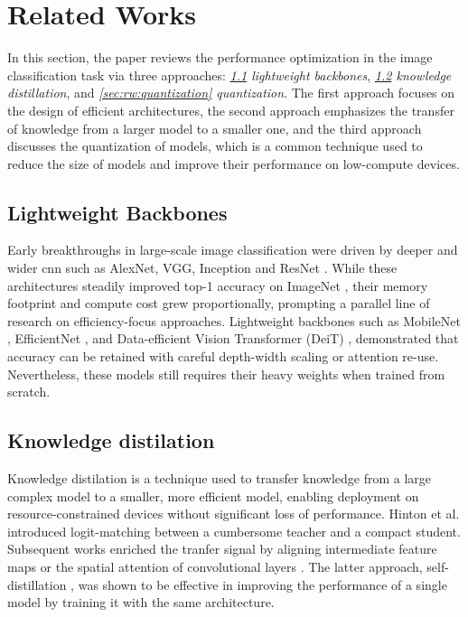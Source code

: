 \section{Related Works}

In this section, the paper reviews the performance optimization
in the image classification task via three approaches:
\textit{\ref{sec:rw:lightweight_backbones} lightweight backbones},
\textit{\ref{sec:rw:knowledge_distillation} knowledge distillation},
and \textit{\ref{sec:rw:quantization} quantization}.
The first approach focuses on the design of efficient architectures,
the second approach emphasizes the transfer of knowledge from a larger model to a smaller one,
and the third approach discusses the quantization of models,
which is a common technique used to reduce the size of models
and improve their performance on low-compute devices.

\subsection{Lightweight Backbones}
\label{sec:rw:lightweight_backbones}

Early breakthroughs in large-scale image classification were driven by deeper and wider \gls*{cnn}
such as AlexNet, VGG, Inception and ResNet \cite{krizhevsky2012imagenet, simonyan2014very, szegedy2015going, he2016deep}.
While these architectures steadily improved top-1 accuracy on ImageNet \cite{deng2009imagenet},
their memory footprint and compute cost grew proportionally,
prompting a parallel line of research on efficiency-focus approaches.
Lightweight backbones such as MobileNet \cite{howard2017mobilenets,sandler2018mobilenetv2},
EfficientNet \cite{tan2019efficientnet}, and Data-efficient Vision Transformer (DeiT) \cite{touvron2021training},
demonstrated that accuracy can be retained with careful depth-width scaling or attention re-use.
Nevertheless, these models still requires their heavy weights when trained from scratch.

\subsection{Knowledge distilation}
\label{sec:rw:knowledge_distillation}

Knowledge distilation is a technique used to transfer knowledge
from a large complex model to a smaller, more efficient model,
enabling deployment on resource-constrained devices without significant loss of performance.
Hinton et al. \cite{hinton2015distilling} introduced logit-matching between a cumbersome teacher and a compact student.
Subsequent works enriched the tranfer signal by aligning intermediate feature maps \cite{romero2014fitnets}
or the spatial attention of convolutional layers \cite{zagoruyko2016paying}.
The latter approach, self-distillation \cite{zhang2019your},
was shown to be effective in improving the performance of a single model
by training it with the same architecture.

